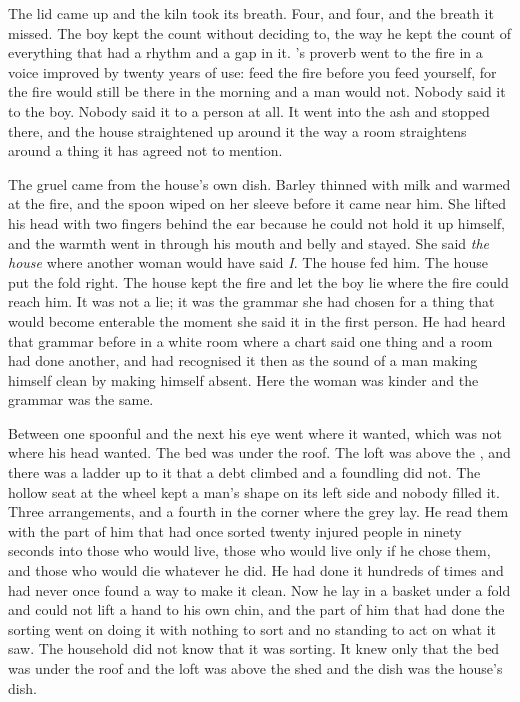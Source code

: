 The lid came up and the kiln took its breath. Four, and four, and the breath it missed. The boy kept the count without deciding to, the way he kept the count of everything that had a rhythm and a gap in it. 's proverb went to the fire in a voice improved by twenty years of use: feed the fire before you feed yourself, for the fire would still be there in the morning and a man would not. Nobody said it to the boy. Nobody said it to a person at all. It went into the ash and stopped there, and the house straightened up around it the way a room straightens around a thing it has agreed not to mention.

The gruel came from the house's own dish. Barley thinned with milk and warmed at the fire, and the spoon wiped on her sleeve before it came near him. She lifted his head with two fingers behind the ear because he could not hold it up himself, and the warmth went in through his mouth and belly and stayed. She said \emph{the house} where another woman would have said \emph{I}. The house fed him. The house put the fold right. The house kept the fire and let the boy lie where the fire could reach him. It was not a lie; it was the grammar she had chosen for a thing that would become enterable the moment she said it in the first person. He had heard that grammar before in a white room where a chart said one thing and a room had done another, and had recognised it then as the sound of a man making himself clean by making himself absent. Here the woman was kinder and the grammar was the same.

Between one spoonful and the next his eye went where it wanted, which was not where his head wanted. The bed was under the roof. The loft was above the , and there was a ladder up to it that a debt climbed and a foundling did not. The hollow seat at the wheel kept a man's shape on its left side and nobody filled it. Three arrangements, and a fourth in the corner where the grey lay. He read them with the part of him that had once sorted twenty injured people in ninety seconds into those who would live, those who would live only if he chose them, and those who would die whatever he did. He had done it hundreds of times and had never once found a way to make it clean. Now he lay in a basket under a fold and could not lift a hand to his own chin, and the part of him that had done the sorting went on doing it with nothing to sort and no standing to act on what it saw. The household did not know that it was sorting. It knew only that the bed was under the roof and the loft was above the shed and the dish was the house's dish.

